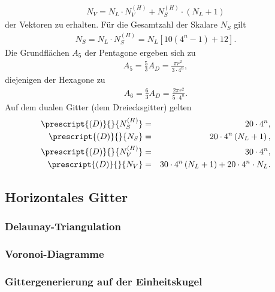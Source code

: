 \documentclass{book}
\begin{document}
%
\begin{eqnarray}
N_V = N_L\cdot N_V^{(H)} + N_S^{(H)}\cdot\left(N_L + 1\right)
\end{eqnarray}
%
der Vektoren zu erhalten. Für die Gesamtzahl der Skalare $N_S$ gilt
%
\begin{eqnarray}
N_S = N_L\cdot N_S^{(H)} = N_L\left[10\left(4^n - 1\right) + 12\right].
\end{eqnarray}
%
Die Grundflächen $A_5$ der Pentagone ergeben sich zu
%
\begin{eqnarray}
A_5 = \frac{5}{3}A_D = \frac{\pi r^2}{3\cdot 4^n}, 
\end{eqnarray}
%
diejenigen der Hexagone zu
%
\begin{eqnarray}
A_6 = \frac{6}{3}A_D = \frac{2\pi r^2}{5\cdot 4^n}.
\end{eqnarray}
%
Auf dem dualen Gitter (dem Dreiecksgitter) gelten
%
\begin{eqnarray}
\prescript{{(D)}}{}{N_S^{(H)}} & = & 20\cdot 4^n,\\
\prescript{{(D)}}{}{N_S} & = & 20\cdot 4^n\left(N_L + 1\right),\\
\prescript{{(D)}}{}{N_V^{(H)}} & = & 30\cdot 4^n,\\
\prescript{{(D)}}{}{N_V} & = & 30\cdot 4^n\left(N_L + 1\right) + 20\cdot 4^n\cdot N_L.
\end{eqnarray}

\subsection{Horizontales Gitter}
\label{sec:horizontales_gitter}

\subsubsection{Delaunay-Triangulation}
\label{sec:delaunay-trangulation}

\subsubsection{Voronoi-Diagramme}
\label{sec:voronoi-diagramme}

\subsubsection{Gittergenerierung auf der Einheitskugel}
\label{sec:gittergenerierung_auf_der_einheitskugel}
\end{document}
